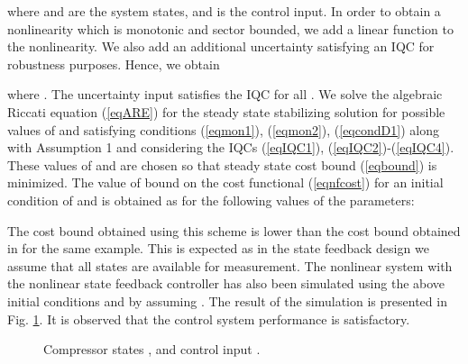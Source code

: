 \documentclass[twocolumn]{autart}
\begin{document}
\noindent where  and  are the system states, and  is the control input. In order to obtain a nonlinearity which is monotonic and sector bounded, we add a linear function to the nonlinearity. We also add an additional uncertainty satisfying an IQC for robustness purposes. Hence, we obtain
\begin{small} 

\end{small}

\noindent where . The uncertainty input  satisfies the IQC 
 for all . We solve the algebraic Riccati equation (\ref{eqARE}) for the steady state stabilizing solution for possible values of  and  satisfying conditions (\ref{eqmon1}), (\ref{eqmon2}), (\ref{eqcondD1}) along with Assumption 1 and considering the IQCs (\ref{eqIQC1}), (\ref{eqIQC2})-(\ref{eqIQC4}). These values of  and  are chosen so that steady state cost bound (\ref{eqbound}) is minimized.   The value of bound on the cost functional (\ref{eqnfcost}) for an initial condition of  and  is obtained as  for the following values of the parameters:
\begin{small}

\end{small}
The cost bound obtained using this scheme is lower than the cost bound obtained in \cite{outputfeedback_petersen} for the same example. This is expected as in the state feedback design we assume that all states are available for measurement. The nonlinear system with the nonlinear state feedback controller has also been simulated using  the above initial conditions and by assuming . The result of the simulation is presented in Fig. \ref{fig:simulation}. It is observed that the control system performance is satisfactory.
\begin{figure}[t]
\hfill
\begin{center}
\caption{Compressor states ,  and control input .}
\label{fig:simulation}
\end{center}
\end{figure}
\vspace{1mm}

\end{document}
